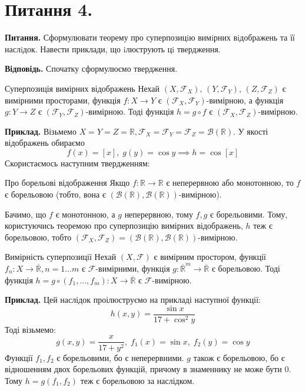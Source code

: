 \documentclass[14pt]{extarticle}
\begin{document}
\section*{Питання 4.}

\textbf{Питання.} Сформулювати теорему про суперпозицiю вимiрних вiдображень та її наслiдок. Навести приклади, що iлюструють цi твердження.

\textbf{Відповідь.} Спочатку сформулюємо твердження.

\begin{theorem*}{Суперпозиція вимірних відображень}
    Нехай $(X,\mathcal{F}_X),\,(Y,\mathcal{F}_Y),\,(Z,\mathcal{F}_Z)$ є вимірними просторами, функція $f: X \to Y$ є $(\mathcal{F}_X,\mathcal{F}_Y)$-вимірною, а функція $g: Y \to Z$ є $(\mathcal{F}_Y,\mathcal{F}_Z)$-вимірною. Тоді функція $h = g \circ f$ є $(\mathcal{F}_X,\mathcal{F}_Z)$-вимірною.
\end{theorem*}

\textbf{Приклад.} Візьмемо $X=Y=Z=\mathbb{R},\mathcal{F}_X=\mathcal{F}_Y=\mathcal{F}_Z=\mathcal{B}(\mathbb{R})$. У якості відображень обираємо
\[
f(x) = [x], \; g(y) = \cos y \implies h = \cos [x]
\]
Скористаємось наступним твердженням:

\begin{statement*}{Про борельові відображення}
    Якщо $f: \mathbb{R} \to \mathbb{R}$ є неперервною або монотонною, то $f$ є борельовою (тобто, вона є $(\mathcal{B}(\mathbb{R}), \mathcal{B}(\mathbb{R}))$-вимірною). 
\end{statement*}

Бачимо, що $f$ є монотонною, а $g$ неперервною, тому $f,g$ є борельовими. Тому, користуючись теоремою про суперпозицію вимірних відображень, $h$ теж є борельовою, тобто $(\mathcal{F}_X,\mathcal{F}_Z)=(\mathcal{B}(\mathbb{R}), \mathcal{B}(\mathbb{R}))$-вимірною. 

\begin{coll*}{Вимірність суперпозиції}
    Нехай $(X,\mathcal{F})$ є вимірним простором, функції $f_n: X \to \overline{\mathbb{R}}, n =1\dots m$ є $\mathcal{F}$-вимірними, функція $g: \overline{\mathbb{R}}^m \to \overline{\mathbb{R}}$ є борельовою. Тоді функція $h = g \circ (f_1,\dots,f_m): X \to \overline{\mathbb{R}}$ є $\mathcal{F}$-вимірною.
\end{coll*}

\textbf{Приклад.} Цей наслідок проілюструємо на прикладі наступної функції:
\[
h(x,y) = \frac{\sin x}{17+\cos^2 y}
\]
Тоді візьмемо:
\[
g(x,y) = \frac{x}{17+y^2}, \; f_1(x) = \sin x, \; f_2(y) = \cos y
\]
Функції $f_1,f_2$ є борельовими, бо є неперервними. $g$ також є борельовою, бо є відношенням двох борельових функцій, причому в знаменнику не може бути $0$. Тому $h=g(f_1,f_2)$ теж є борельовою за наслідком.
\pagebreak
\end{document}
